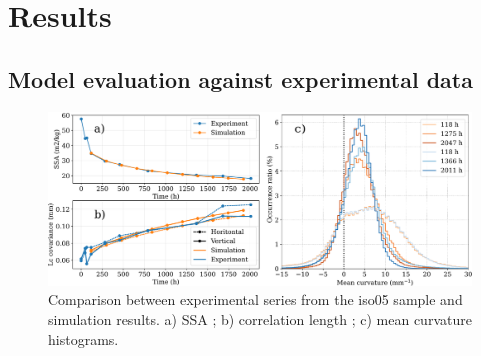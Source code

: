 \documentclass[draft,ms]{agujournal2019}
\begin{document}


\section{Results}

\subsection{Model evaluation against experimental data}
\label{Section:Calibration}

\begin{figure}
    \centering
    \includegraphics[width=\linewidth]{Figures/flin_evaluation_courbes_lc_ssa_histo.pdf}
    \caption{Comparison between \protect{} experimental series from the iso05 sample and simulation results. a) SSA ; b) correlation length ; c) mean curvature histograms.}
    \label{fig:flin_evaluation}
\end{figure}
\end{document}
